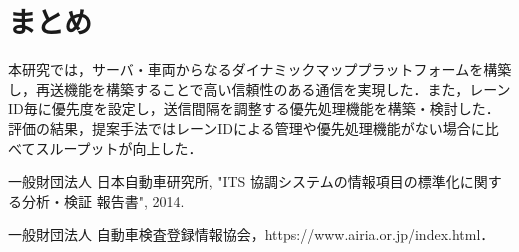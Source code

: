\documentclass[a4paper,10pt,twocolumn,uplatex]{jsarticle}
\begin{document}
\section{まとめ}
本研究では，サーバ・車両からなるダイナミックマッププラットフォームを構築し，再送機能を構築することで高い信頼性のある通信を実現した．また，レーンID毎に優先度を設定し，送信間隔を調整する優先処理機能を構築・検討した．評価の結果，提案手法ではレーンIDによる管理や優先処理機能がない場合に比べてスループットが向上した．

{
\footnotesize
\begin{thebibliography}{99}

一般財団法人 日本自動車研究所, "ITS 協調システムの情報項目の標準化に関する分析・検証 報告書", 2014.

一般財団法人 自動車検査登録情報協会，https://www.airia.or.jp/index.html．

\end{thebibliography}
}

\end{document}
